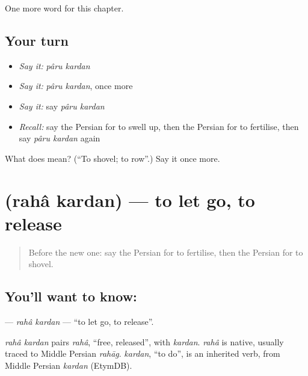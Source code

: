 \begin{grammarlens}[title={What you've built}]
One more word for this chapter.
\end{grammarlens}

\subsection*{Your turn}
\begin{itemize}
\raggedright
  \item \emph{Say it:} \emph{pâru kardan}
  \item \emph{Say it:} \emph{pâru kardan}, once more
  \item \emph{Say it:} say \emph{pâru kardan}
  \item \emph{Recall:} say the Persian for to swell up, then the Persian for to fertilise, then say \emph{pâru kardan} again
\end{itemize}

\begin{tcolorbox}[breakable,colback=teal!4,colframe=teal!35!black,title={Before you move on}]
What does   mean? (\textquotedblleft{}To shovel; to row\textquotedblright{}.) Say it once more.
\end{tcolorbox}
\section[\texorpdfstring{\fa{رها} \fa{کردن} (rahâ kardan)}{رها کردن (rahâ kardan)}]{  (rahâ kardan) — to let go, to release}

\label{lesson:FA-C226-raha-kardan}



\begin{quote}
Before the new one: say the Persian for to fertilise, then the Persian for to shovel.
\end{quote}

\subsection*{You'll want to know:  }
\textbf{ } — \emph{rahâ kardan} — \textquotedblleft{}to let go, to release\textquotedblright{}.

\begin{cousinweb}
\emph{rahâ kardan} pairs \emph{rahâ}, \textquotedblleft{}free, released\textquotedblright{}, with \emph{kardan}. \emph{rahâ} is native, usually traced to Middle Persian \emph{rahāg}. \emph{kardan}, \textquotedblleft{}to do\textquotedblright{}, is an inherited verb, from Middle Persian \emph{kardan} (EtymDB).
\end{cousinweb}

